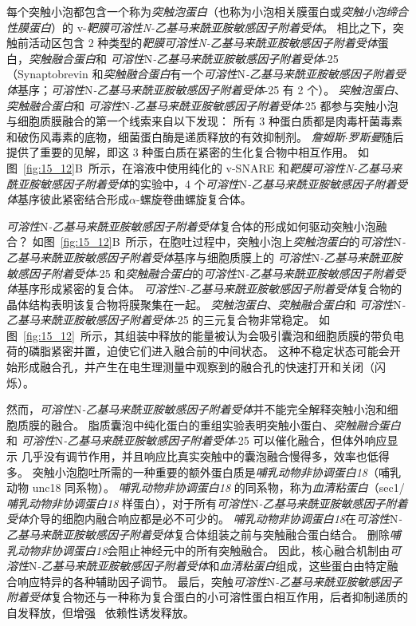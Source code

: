 每个突触小泡都包含一个称为\textit{突触泡蛋白}（也称为小泡相关膜蛋白或\textit{突触小泡缔合性膜蛋白}）的 v-\textit{靶膜可溶性N-乙基马来酰亚胺敏感因子附着受体}。
相比之下，突触前活动区包含 2 种类型的\textit{靶膜可溶性N-乙基马来酰亚胺敏感因子附着受体}蛋白，\textit{突触融合蛋白}和 \textit{可溶性}N\textit{-乙基马来酰亚胺敏感因子附着受体}-25（Synaptobrevin 和\textit{突触融合蛋白}有一个\textit{可溶性}N\textit{-乙基马来酰亚胺敏感因子附着受体}基序；\textit{可溶性}N\textit{-乙基马来酰亚胺敏感因子附着受体}-25 有 2 个）。
\textit{突触泡蛋白}、\textit{突触融合蛋白}和 \textit{可溶性}N\textit{-乙基马来酰亚胺敏感因子附着受体}-25 都参与突触小泡与细胞质膜融合的第一个线索来自以下发现：
所有 3 种蛋白质都是肉毒杆菌毒素和破伤风毒素的底物，细菌蛋白酶是递质释放的有效抑制剂。
\textit{詹姆斯$\cdot$罗斯曼}随后提供了重要的见解，即这 3 种蛋白质在紧密的生化复合物中相互作用。
如图~\ref{fig:15_12}B~所示，在溶液中使用纯化的 v-SNARE 和\textit{靶膜可溶性N-乙基马来酰亚胺敏感因子附着受体}的实验中，4 个\textit{可溶性}N\textit{-乙基马来酰亚胺敏感因子附着受体}基序彼此紧密结合形成$\alpha$-螺旋卷曲螺旋复合体。


\textit{可溶性}N\textit{-乙基马来酰亚胺敏感因子附着受体}复合体的形成如何驱动突触小泡融合？
如图~\ref{fig:15_12}B~所示，在胞吐过程中，突触小泡上\textit{突触泡蛋白}的\textit{可溶性}N\textit{-乙基马来酰亚胺敏感因子附着受体}基序与细胞质膜上的 \textit{可溶性}N\textit{-乙基马来酰亚胺敏感因子附着受体}-25 和\textit{突触融合蛋白}的\textit{可溶性}N\textit{-乙基马来酰亚胺敏感因子附着受体}基序形成紧密的复合体。
\textit{可溶性}N\textit{-乙基马来酰亚胺敏感因子附着受体}复合物的晶体结构表明该复合物将膜聚集在一起。
\textit{突触泡蛋白}、\textit{突触融合蛋白}和 \textit{可溶性}N\textit{-乙基马来酰亚胺敏感因子附着受体}-25 的三元复合物非常稳定。
如图~\ref{fig:15_12}~所示，其组装中释放的能量被认为会吸引囊泡和细胞质膜的带负电荷的磷脂紧密并置，迫使它们进入融合前的中间状态。
这种不稳定状态可能会开始形成融合孔，并产生在电生理测量中观察到的融合孔的快速打开和关闭（闪烁）。


然而，\textit{可溶性}N\textit{-乙基马来酰亚胺敏感因子附着受体}并不能完全解释突触小泡和细胞质膜的融合。
脂质囊泡中纯化蛋白的重组实验表明突触小蛋白、\textit{突触融合蛋白}和 \textit{可溶性}N\textit{-乙基马来酰亚胺敏感因子附着受体}-25 可以催化融合，但体外响应显示  几乎没有调节作用，并且响应比真实突触中的囊泡融合慢得多，效率也低得多。
突触小泡胞吐所需的一种重要的额外蛋白质是\textit{哺乳动物非协调蛋白18}（哺乳动物 unc18 同系物）。
\textit{哺乳动物非协调蛋白18} 的同系物，称为\textit{血清粘蛋白}（sec1/\textit{哺乳动物非协调蛋白18} 样蛋白），对于所有\textit{可溶性}N\textit{-乙基马来酰亚胺敏感因子附着受体}介导的细胞内融合响应都是必不可少的。
\textit{哺乳动物非协调蛋白18}在\textit{可溶性}N\textit{-乙基马来酰亚胺敏感因子附着受体}复合体组装之前与突触融合蛋白结合。
删除\textit{哺乳动物非协调蛋白18}会阻止神经元中的所有突触融合。
因此，核心融合机制由\textit{可溶性}N\textit{-乙基马来酰亚胺敏感因子附着受体}和\textit{血清粘蛋白}组成，这些蛋白由特定融合响应特异的各种辅助因子调节。
最后，突触\textit{可溶性}N\textit{-乙基马来酰亚胺敏感因子附着受体}复合物还与一种称为复合蛋白的小可溶性蛋白相互作用，后者抑制递质的自发释放，但增强~ 依赖性诱发释放。


